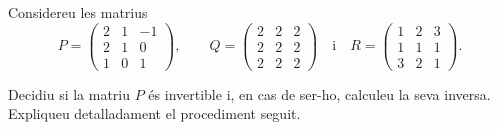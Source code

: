Considereu les matrius
\[
P=\begin{pmatrix}2&1&-1\\2&1&0\\1&0&1\end{pmatrix},\qquad
Q=\begin{pmatrix}2&2&2\\2&2&2\\2&2&2\end{pmatrix}\quad\text{i}\quad
R=\begin{pmatrix}1&2&3\\1&1&1\\3&2&1\end{pmatrix}.
\]

\begin{apartats}

Decidiu si la matriu $P$ és invertible i, en cas de ser-ho, calculeu la seva inversa. Expliqueu detalladament
el procediment seguit.


\end{apartats}
